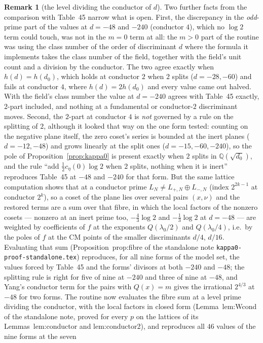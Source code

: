\documentclass[11pt,reqno]{amsart}
\theoremstyle{plain}
\theoremstyle{definition}
\newtheorem{remark}[theorem]{Remark}
\newcommand{\Q}{\mathbb{Q}}
\begin{document}
\begin{remark}[the level dividing the conductor of $d$]
Two further facts from the comparison with Table~45 narrow what is open. First, the discrepancy in
the \emph{odd}-prime part of the values at $d=-48$ and $-240$ (conductor $4$), which no $\log 2$ term
could touch, was not in the $m=0$ term at all: the $m>0$ part of the routine was using the class
number of the order of discriminant $d$ where the formula it implements takes the class number of
the field, together with the field's unit count and a division by the conductor. The two agree
exactly when $h(d)=h(d_0)$, which holds at conductor $2$ when $2$ splits ($d=-28,-60$) and fails at
conductor $4$, where $h(d)=2h(d_0)$ and every value came out halved. With the field's class number
the value at $d=-240$ agrees with Table~45 exactly, $2$-part included, and nothing at a fundamental
or conductor-$2$ discriminant moves. Second, the $2$-part at conductor $4$ is \emph{not} governed by a rule on the splitting of
$2$, although it looked that way on the one form tested: counting on the negative plane itself,
the zero coset's series is bounded at the inert planes ($d=-12,-48$) and grows linearly at the
split ones ($d=-15,-60,-240$), so the pole of Proposition~\ref{prop:kappa0} is present exactly when
$2$ splits in $\Q(\sqrt{d_0})$, and the rule ``add $\tfrac12c_\eta(0)\log2$ when $2$ splits, nothing
when it is inert'' reproduces Table~45 at $-48$ and $-240$ for that form. But the same lattice
computation shows that at a conductor prime $L_N\neq L_{+,N}\oplus L_{-,N}$ (index $2^{2k-1}$ at
conductor $2^k$), so a coset of the plane lies over several pairs $(x,\nu)$ and the restored terms
are a sum over that fibre, in which the local factors of the nonzero cosets --- nonzero at an inert
prime too, $-\tfrac43\log2$ and $-\tfrac13\log2$ at $d=-48$ --- are weighted by coefficients of
$f$ at the exponents $Q(\lambda_0/2)$ and $Q(\lambda_0/4)$, i.e.\ by the poles of $f$ at the CM points
of the smaller discriminants $d/4$, $d/16$. Evaluating that sum (Proposition~prop:fibre of the
standalone note \texttt{kappa0-proof-standalone.tex}) reproduces, for all nine forms of the model
set, the values forced by Table~45 and the forms' divisors at both $-240$ and $-48$; the
splitting rule is right for five of nine at $-240$ and three of nine at $-48$, and Yang's conductor
term for the pairs with $Q(x)=m$ gives the irrational $2^{4/3}$ at $-48$ for two forms. The routine
now evaluates the fibre sum at a level prime dividing the conductor, with the local factors in closed
form (Lemma~lem:Wcond of the standalone note, proved for every $p$ on the lattices of its
Lemmas~lem:conductor and lem:conductor2), and reproduces all $46$ values of the nine forms at the seven

\end{remark}
\end{document}
